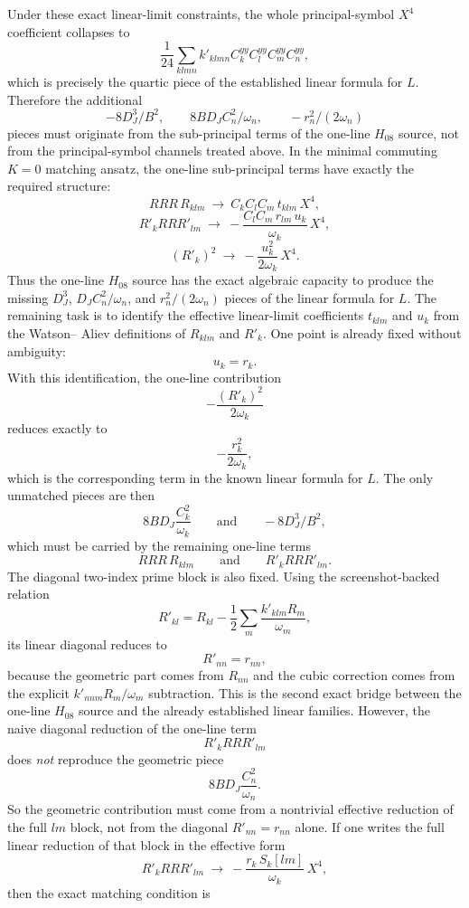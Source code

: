 \documentclass[aip,jcp,reprint,floatfix]{revtex4-2}
\begin{document}
Under these exact linear-limit constraints, the whole principal-symbol
\(X^4\) coefficient collapses to
\[
\frac{1}{24}\sum_{klmn}k'_{klmn}C_k^{yy}C_l^{yy}C_m^{yy}C_n^{yy},
\]
which is precisely the quartic piece of the established linear formula for
\(L\). Therefore the additional
\[
-8D_J^3/B^2,\qquad 8BD_JC_n^2/\omega_n,\qquad -r_n^2/(2\omega_n)
\]
pieces must originate from the sub-principal terms of the one-line \(H_{08}\)
source, not from the principal-symbol channels treated above.
In the minimal commuting \(K=0\) matching ansatz, the one-line sub-principal
terms have exactly the required structure:
\[
RRR\,R_{klm}\ \longrightarrow\ C_kC_lC_m\,t_{klm}\,X^4,
\]
\[
R'_kRRR'_{lm}\ \longrightarrow\ -\frac{C_lC_m\,r_{lm}\,u_k}{\omega_k}\,X^4,
\]
\[
(R'_k)^2\ \longrightarrow\ -\frac{u_k^2}{2\omega_k}\,X^4.
\]
Thus the one-line \(H_{08}\) source has the exact algebraic capacity to produce
the missing \(D_J^3\), \(D_J C_n^2/\omega_n\), and \(r_n^2/(2\omega_n)\)
pieces of the linear formula for \(L\). The remaining task is to identify the
effective linear-limit coefficients \(t_{klm}\) and \(u_k\) from the Watson--
Aliev definitions of \(R_{klm}\) and \(R'_k\).
One point is already fixed without ambiguity:
\[
u_k=r_k.
\]
With this identification, the one-line contribution
\[
-\frac{(R'_k)^2}{2\omega_k}
\]
reduces exactly to
\[
-\frac{r_k^2}{2\omega_k},
\]
which is the corresponding term in the known linear formula for \(L\). The
only unmatched pieces are then
\[
8BD_J\frac{C_k^2}{\omega_k}
\qquad\text{and}\qquad
-8D_J^3/B^2,
\]
which must be carried by the remaining one-line terms
\[
RRR\,R_{klm}
\qquad\text{and}\qquad
R'_kRRR'_{lm}.
\]
The diagonal two-index prime block is also fixed. Using the screenshot-backed
relation
\[
R'_{kl}=R_{kl}-\frac12\sum_m \frac{k'_{klm}R_m}{\omega_m},
\]
its linear diagonal reduces to
\[
R'_{nn}=r_{nn},
\]
because the geometric part comes from \(R_{nn}\) and the cubic correction comes
from the explicit \(k'_{nnm}R_m/\omega_m\) subtraction. This is the second
exact bridge between the one-line \(H_{08}\) source and the already
established linear families.
However, the naive diagonal reduction of the one-line term
\[
R'_kRRR'_{lm}
\]
does \emph{not} reproduce the geometric piece
\[
8BD_J\frac{C_n^2}{\omega_n}.
\]
So the geometric contribution must come from a nontrivial effective reduction
of the full \(lm\) block, not from the diagonal \(R'_{nn}=r_{nn}\) alone.
If one writes the full linear reduction of that block in the effective form
\[
R'_kRRR'_{lm}\ \longrightarrow\ -\frac{r_k\,S_k[lm]}{\omega_k}\,X^4,
\]
then the exact matching condition is
\end{document}
